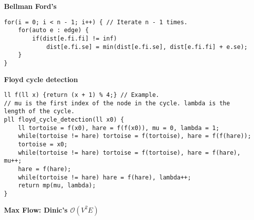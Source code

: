 \documentclass[a4paper,10pt]{article}
\newcommand{\titleAlg}[1]{\vspace{-10pt}
\begin{center}\textbf{#1}\end{center} \vspace{-10pt}}
\begin{document}
\titleAlg{Bellman Ford's}
\begin{verbatim}
for(i = 0; i < n - 1; i++) { // Iterate n - 1 times.
    for(auto e : edge) {
        if(dist[e.fi.fi] != inf)
            dist[e.fi.se] = min(dist[e.fi.se], dist[e.fi.fi] + e.se);
    }
}
\end{verbatim}
\titleAlg{Floyd cycle detection}
\begin{verbatim}
ll f(ll x) {return (x + 1) % 4;} // Example.
// mu is the first index of the node in the cycle. lambda is the length of the cycle.
pll floyd_cycle_detection(ll x0) {
    ll tortoise = f(x0), hare = f(f(x0)), mu = 0, lambda = 1;
    while(tortoise != hare) tortoise = f(tortoise), hare = f(f(hare));
    tortoise = x0;
    while(tortoise != hare) tortoise = f(tortoise), hare = f(hare), mu++;
    hare = f(hare);
    while(tortoise != hare) hare = f(hare), lambda++;
    return mp(mu, lambda);
}
\end{verbatim}
\titleAlg{Max Flow: Dinic's $\mathcal{O}(V^2E)$}
\end{document}
